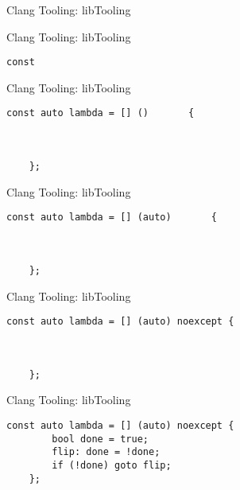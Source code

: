 \begin{frame}[fragile]{Clang Tooling: libTooling}
\end{frame}

\begin{frame}[fragile]{Clang Tooling: libTooling}
  \begin{lstlisting}[basicstyle=\large\ttfamily]
    const
  \end{lstlisting}
  \vspace{2cm}
\end{frame}

\begin{frame}[fragile]{Clang Tooling: libTooling}
  \begin{lstlisting}[basicstyle=\large\ttfamily]
    const auto lambda = [] ()       {



    };
  \end{lstlisting}
\end{frame}

\begin{frame}[fragile]{Clang Tooling: libTooling}
  \begin{lstlisting}[basicstyle=\large\ttfamily]
    const auto lambda = [] (auto)       {



    };
  \end{lstlisting}
\end{frame}

\begin{frame}[fragile]{Clang Tooling: libTooling}
  \begin{lstlisting}[basicstyle=\large\ttfamily]
    const auto lambda = [] (auto) noexcept {



    };
  \end{lstlisting}
\end{frame}

\begin{frame}[fragile]{Clang Tooling: libTooling}
  \begin{lstlisting}[basicstyle=\large\ttfamily]
    const auto lambda = [] (auto) noexcept {
        bool done = true;
        flip: done = !done;
        if (!done) goto flip;
    };
  \end{lstlisting}
\end{frame}
